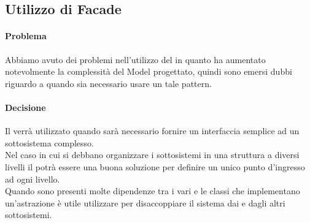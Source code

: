 \subsection{Utilizzo di Facade}
\paragraph{Problema}
Abbiamo avuto dei problemi nell'utilizzo del   in quanto ha aumentato notevolmente la complessità del Model progettato, quindi sono emersi dubbi riguardo a quando sia necessario usare un tale pattern.
\paragraph{Decisione}
Il   verrà utilizzato quando sarà necessario fornire un interfaccia semplice ad un sottosistema complesso. \\
Nel caso in cui si debbano organizzare i sottosistemi in una struttura a diversi livelli il  potrà essere una buona soluzione per definire un unico punto d’ingresso ad ogni livello.\\
Quando sono presenti molte dipendenze tra i vari  e le classi che implementano un’astrazione è utile utilizzare  per disaccoppiare il sistema dai  e dagli altri sottosistemi. \\
